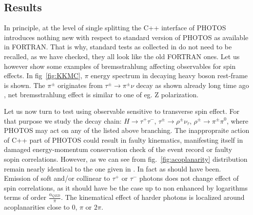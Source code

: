 \documentclass[]{Photos_interface_design}
\begin{document}
\subsection{Results}
\label{sec:results}
In principle, at the level of single splitting the C++ interface of PHOTOS
introduces nothing new with respect to standard version of PHOTOS as available 
in FORTRAN. That is why, standard tests as collected in \cite{Photos_tests} do not need 
to be recalled, as we have checked, they all look like the old FORTRAN ones.
Let us however show some examples of bremsstrahlung affecting observables
for spin effects. In  fig~\ref{fig:KKMC}, $\pi$ energy spectrum in decaying
heavy boson rest-frame is shown. The $\pi^\pm$ originates from $\tau^\pm \to \pi^\pm \nu $ decay as shown already long time ago \cite{Boillot:1988re}, net
bremsstrahlung  effect is similar 
to one of eg. Z polarization.

Let us now turn to test using observable sensitive to transverse spin effect.
 For that purpose we study the decay chain:
$H\to \tau^+\tau^-$, $\tau^\pm \to \rho^\pm \nu_\tau$, 
$\rho^\pm \to \pi^\pm \pi^0$, where PHOTOS may act on any of the listed above branching. The inappropraite action of C++ part of PHOTOS could result in faulty
kinematics, manifesting itself in damaged energy-momentum conservation check of the event record or faulty sopin correlations. However, as we can see from 
fig.~\ref{fig:acoplanarity} distribution remain nearly identical to the 
one given in \cite{tauolaC++}. In fact as should have been. Emission of soft
and/or collinear to $\tau^+$ or $\tau^-$ photons does not change effect of 
spin correlations, as it should have be the case up to non enhanced by logarithms terms of order $\frac{\alpha_{QED}}{\pi}$. The kinematical effect of harder 
photons is localized around acoplanarities close to $0$, $\pi$ or $2\pi$. 
\end{document}
